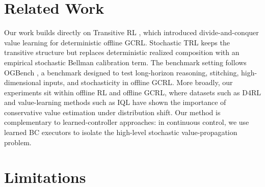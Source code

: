 \documentclass[10pt]{article}
\begin{document}
\begin{table}[t]
\centering
\caption{AntMaze learned high-level module screen. A raw-observation MLP
transition head and raw-observation tie-preserving policy head preserve the
hard-task advantage across three evaluation seeds. Source:
\texttt{results/paper\_tables/antmaze\_rawobs\_transition\_tie\_policy\_head\_ep10\_evalseed012.csv}.}
\label{tab:learned-modules-main}
\end{table}

\section{Related Work}

Our work builds directly on Transitive RL \citep{park2026transitive}, which
introduced divide-and-conquer value learning for deterministic offline GCRL.
Stochastic TRL keeps the transitive structure but replaces deterministic
realized composition with an empirical stochastic Bellman calibration term.
The benchmark setting follows OGBench \citep{park2024ogbench}, a benchmark
designed to test long-horizon reasoning, stitching, high-dimensional inputs,
and stochasticity in offline GCRL. More broadly, our experiments sit within
offline RL and offline GCRL, where datasets such as D4RL \citep{fu2020d4rl}
and value-learning methods such as IQL \citep{kostrikov2021iql} have shown the
importance of conservative value estimation under distribution shift. Our
method is complementary to learned-controller approaches: in continuous
control, we use learned BC executors to isolate the high-level stochastic
value-propagation problem.

\section{Limitations}
\end{document}
